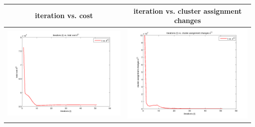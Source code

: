 \documentclass[fleqn]{article}
\begin{document}
\begin{center}
  \begin{longtable}{ c | c }
	\multicolumn{1}{c}{iteration vs. cost} & 
	\multicolumn{1}{c}{iteration vs. cluster assignment changes}  \\
    \hline
    \includegraphics[scale=0.4]{./pics/task1and2/rio_k=4_random/t_vs_d_random_4_rio.png}  & \includegraphics[scale=0.4]{./pics/task1and2/rio_k=4_random/t_vs_s_random_4_rio.png} \\
    \hline
  \end{longtable}
\end{center}
\end{document}
